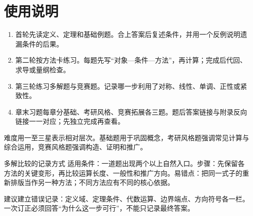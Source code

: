 \chapter{使用说明}
\begin{enumerate}
\item 首轮先读定义、定理和基础例题。合上答案后复述条件，并用一个反例说明遗漏条件的后果。
\item 第二轮按方法卡练习。每题先写“对象—条件—方法”，再计算；完成后代回、求导或量纲检查。
\item 第三轮练习多解题与竞赛题。记录哪一步利用了对称、线性、单调、正性或紧致性。
\item 章末习题每章分基础、考研风格、竞赛拓展各三题。题后答案链接与附录反向链接一一对应；先独立完成再查看。
\end{enumerate}
难度用一至三星表示相对层次。基础题用于巩固概念，考研风格题强调常见计算与综合运用，竞赛风格题强调构造、证明和推广。
\begin{method}{多解比较的记录方式}
适用条件：一道题出现两个以上自然入口。步骤：先保留各方法的关键变形，再比较运算长度、一般性和推广方向。易错点：把同一式子的重新排版当作另一种方法；不同方法应有不同的核心依据。
\end{method}
建议建立错误记录：定义域、定理条件、代数运算、边界端点、方向符号各一栏。一次订正必须回答“为什么这一步可行”，不能只记录最终答案。
